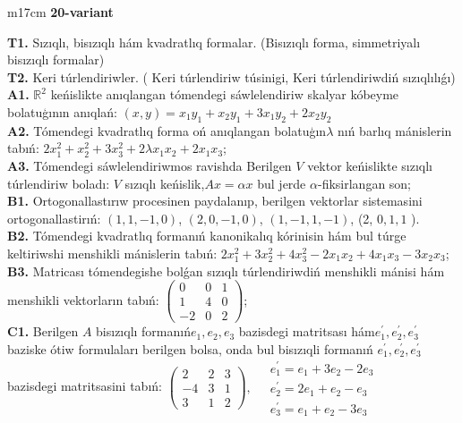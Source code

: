 \documentclass{article}
\begin{document}
\begin{tabular}{m{17cm}}
\textbf{20-variant}
\newline

\textbf{T1.} Sızıqlı, bisızıqlı hám kvadratlıq formalar. (Bisızıqlı forma,  simmetriyalı bisızıqlı formalar)  \\
\textbf{T2.} Keri túrlendiriwler. ( Keri túrlendiriw túsinigi,   Keri túrlendiriwdiń sızıqlılıǵı) \\
\textbf{A1.} \(\mathbb{R}^{2}\) keńislikte anıqlangan tómendegi sáwlelendiriw skalyar kóbeyme bolatuģının anıqlań: \((x,y) = x_{1}y_{1} + x_{2}y_{1} + 3x_{1}y_{2} + 2x_{2}y_{2}\) \\
\textbf{A2.} Tómendegi kvadratlıq forma oń anıqlangan bolatuģın\(\lambda\) nıń barlıq mánislerin tabıń: \(2x_{1}^{2} + x_{2}^{2} + 3x_{3}^{2} + 2\lambda x_{1}x_{2} + 2x_{1}x_{3}\); \\
\textbf{A3.} Tómendegi sáwlelendiriwmos ravishda Berilgen \(V\) vektor keńislikte sızıqlı túrlendiriw boladı: \(V\) sızıqlı keńislik,\(Ax = \alpha x\) bul jerde \(\alpha\)-fiksirlangan son; \\
\textbf{B1.} Ortogonallastırıw procesinen paydalanıp, berilgen vektorlar sistemasini ortogonallastirıń: \((1,1, - 1,0)\), \((2,0, - 1,0)\), \((1, - 1,1, - 1)\), (2, \(0,1,1\) ). \\
\textbf{B2.} Tómendegi kvadratlıq formanıń kanonikalıq kórinisin hám bul túrge keltiriwshi menshikli mánislerin tabıń: \(2x_{1}^{2} + 3x_{2}^{2} + 4x_{3}^{2} - 2x_{1}x_{2} + 4x_{1}x_{3} - 3x_{2}x_{3}\); \\
\textbf{B3.} Matricası tómendegishe bolǵan sızıqlı túrlendiriwdiń menshikli mánisi hám menshikli vektorların tabıń: \(\begin{pmatrix} 0 & 0 & 1 \\ 1 & 4 & 0 \\  - 2 & 0 & 2 \end{pmatrix}\); \\
\textbf{C1.} Berilgen \(A\) bisızıqlı formanıń\(e_{1},e_{2},e_{3}\) bazisdegi matritsası hám\(e_{1}^{'},e_{2}^{'},e_{3}^{'}\) baziske ótiw formulaları berilgen bolsa, onda bul bisızıqli formanıń \(e_{1}^{'},e_{2}^{'},e_{3}^{'}\) bazisdegi matritsasini tabıń: \(\begin{pmatrix} 2 & 2 & 3 \\  - 4 & 3 & 1 \\ 3 & 1 & 2 \end{pmatrix},\ \begin{matrix}  & e_{1}^{'} = e_{1} + 3e_{2} - 2e_{3} \\  & e_{2}^{'} = 2e_{1} + e_{2} - e_{3} \\  & e_{3}^{'} = e_{1} + e_{2} - 3e_{3} \end{matrix}\) \\

\end{tabular}
\end{document}
